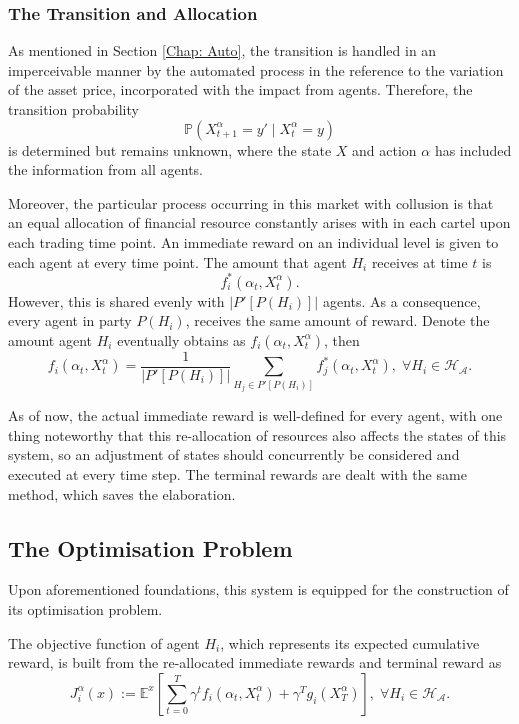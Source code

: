 \documentclass[11pt,twoside]{article}
\numberwithin{Theorem}{section}
\numberwithin{Definition}{section}
\numberwithin{Lemma}{section}
\numberwithin{Algorithm}{section}
\numberwithin{equation}{section}
\begin{document}
\subsubsection{The Transition and Allocation}
As mentioned in Section \ref{Chap: Auto}, the transition is handled in an imperceivable manner by the automated process in the reference to the variation of the asset price, incorporated with the impact from agents. Therefore, the transition probability
$$\mathbb{P}({X}_{t+1}^{\alpha}=y'\mid {X}_{t}^{\alpha}=y)$$
is determined but remains unknown, where the state $X$ and action $\alpha$ has included the information from all agents. 

Moreover, the particular process occurring in this market with collusion is that an equal allocation of financial resource constantly arises with in each cartel upon each trading time point. An immediate reward on an individual level is given to each agent at every time point. The amount that agent $H_i$ receives at time $t$ is
$$
f^*_i(\alpha_t,X_t^{\alpha}).
$$
However, this is shared evenly with $|P'\left[P(H_i)\right]|$ agents. As a consequence, every agent in party $P(H_i)$, receives the same amount of reward. Denote the amount agent $H_i$ eventually obtains as $f_i(\alpha_t,X_t^{\alpha})$, then
$$
f_i(\alpha_t,X_t^{\alpha})=\frac{1}{|P'\left[P(H_i)\right]|}
\sum_{H_j\in P'\left[P(H_i)\right]}f^*_j(\alpha_t,X_t^{\alpha}),\;\forall H_i\in\mathcal{H_A}.
$$

As of now, the actual immediate reward is well-defined for every agent, with one thing noteworthy that this re-allocation of resources also affects the states of this system, so an adjustment of states should concurrently be considered and executed at every time step. The terminal rewards are dealt with the same method, which saves the elaboration.
\clearpage



\subsection{The Optimisation Problem}
Upon aforementioned foundations, this system is equipped for the construction of its optimisation problem.

The objective function of agent $H_i$, which represents its expected cumulative reward, is built from the re-allocated immediate rewards and terminal reward as
$$
J_i^{\alpha}(x):=\mathbb{E}^x\left[\sum_{t=0}^T\gamma^tf_i(\alpha_t,X_t^{\alpha})+\gamma^Tg_i(X_T^{\alpha})\right],\; \forall H_i\in\mathcal{H_A}.
$$
\end{document}
